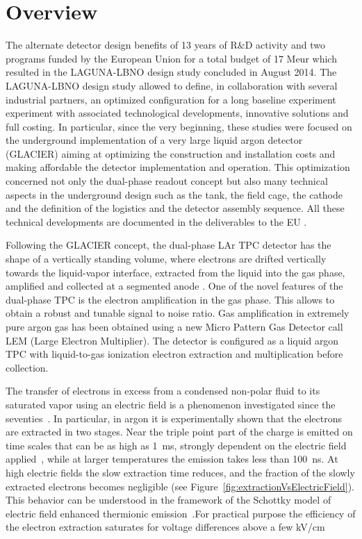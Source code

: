 \section{Overview}
\label{sec:detectors-fd-ref-ov}


The alternate detector design benefits of 13 years of R\&D activity and two programs funded by the European Union for a total budget of 17 Meur which resulted in the LAGUNA-LBNO design study concluded in August 2014. The LAGUNA-LBNO design study allowed to define, in collaboration with several industrial partners, an optimized configuration for a long baseline experiment  experiment with associated technological developments, innovative solutions and full costing. In particular, since the very beginning, these studies were focused on the underground implementation of a very large liquid argon detector (GLACIER) aiming at optimizing the construction and installation costs and making affordable the detector implementation and operation. This optimization concerned not only the dual-phase readout concept but also many technical aspects in the underground design such as the tank, the field cage, the cathode  and the definition of the logistics and the detector assembly sequence. All these technical developments are documented in the deliverables to the EU \cite{LAGUNA-LBNO-deliv}.

Following the GLACIER concept, the dual-phase LAr TPC detector has the shape of a vertically standing volume, where electrons are drifted vertically towards the liquid-vapor interface, extracted from the liquid into the gas phase, amplified and collected at a segmented anode \cite{Badertscher:2013wm,Badertscher:2012dq,Badertscher:2010zg}. One of the novel features of the dual-phase TPC is the electron amplification in the gas phase. This allows to obtain a robust and tunable signal to noise ratio. Gas amplification in extremely pure argon gas has been obtained using a new Micro Pattern Gas Detector call LEM (Large Electron Multiplier). The detector is configured as a liquid argon TPC with liquid-to-gas ionization electron extraction and multiplication before collection.

The transfer of electrons in excess from a condensed non-polar fluid to its saturated vapor using an electric field is a phenomenon investigated since the seventies~\cite{Dolgoshein1970}. In particular, in argon it is experimentally shown that the electrons are extracted in two stages. Near the triple point part of the charge is emitted on time scales that can be as high as 1~ms, strongly dependent on the electric field applied~\cite{Gushchin1982b, Borghesani1990}, while at larger temperatures the emission takes less than 100~ns. At high electric fields the slow extraction time reduces, and the fraction of the slowly extracted electrons becomes negligible (see Figure~\ref{fig:extractionVsElectricField}). This behavior can be understood in the framework of the Schottky model of electric field enhanced thermionic emission~\cite{Murphy1956}.For practical purpose the efficiency of the electron extraction saturates for voltage differences above a few kV/cm


